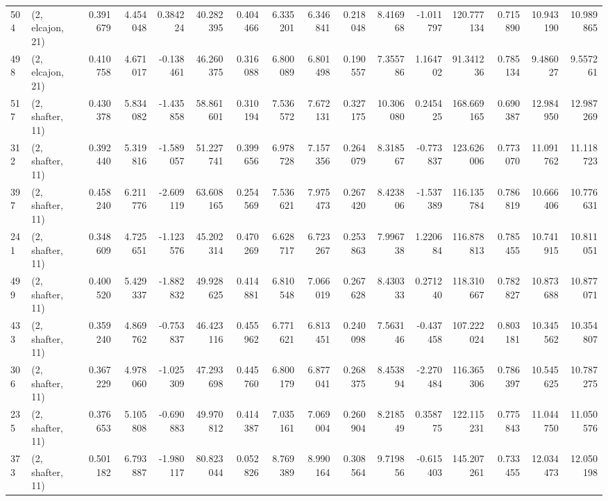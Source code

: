 \begin{tabular}{llrrrrrrrrrrrrrr}
504 &  (2, elcajon, 21) &   0.391679 &   4.454048 &   0.384224 &    40.282395 &   0.404466 &   6.335201 &   6.346841 &  0.218048 &   8.416968 &  -1.011797 &    120.777134 &   0.715890 &  10.943190 &   10.989865 \\
498 &  (2, elcajon, 21) &   0.410758 &   4.671017 &  -0.138461 &    46.260375 &   0.316088 &   6.800089 &   6.801498 &  0.190557 &   7.355786 &   1.164702 &     91.341236 &   0.785134 &   9.486027 &    9.557261 \\
517 &  (2, shafter, 11) &   0.430378 &   5.834082 &  -1.435858 &    58.861601 &   0.310194 &   7.536572 &   7.672131 &  0.327175 &  10.306080 &   0.245425 &    168.669165 &   0.690387 &  12.984950 &   12.987269 \\
312 &  (2, shafter, 11) &   0.392440 &   5.319816 &  -1.589057 &    51.227741 &   0.399656 &   6.978728 &   7.157356 &  0.264079 &   8.318567 &  -0.773837 &    123.626006 &   0.773070 &  11.091762 &   11.118723 \\
397 &  (2, shafter, 11) &   0.458240 &   6.211776 &  -2.609119 &    63.608165 &   0.254569 &   7.536621 &   7.975473 &  0.267420 &   8.423806 &  -1.537389 &    116.135784 &   0.786819 &  10.666406 &   10.776631 \\
241 &  (2, shafter, 11) &   0.348609 &   4.725651 &  -1.123576 &    45.202314 &   0.470269 &   6.628717 &   6.723267 &  0.253863 &   7.996738 &   1.220684 &    116.878813 &   0.785455 &  10.741915 &   10.811051 \\
499 &  (2, shafter, 11) &   0.400520 &   5.429337 &  -1.882832 &    49.928625 &   0.414881 &   6.810548 &   7.066019 &  0.267628 &   8.430333 &   0.271240 &    118.310667 &   0.782827 &  10.873688 &   10.877071 \\
433 &  (2, shafter, 11) &   0.359240 &   4.869762 &  -0.753837 &    46.423116 &   0.455962 &   6.771621 &   6.813451 &  0.240098 &   7.563146 &  -0.437458 &    107.222024 &   0.803181 &  10.345562 &   10.354807 \\
306 &  (2, shafter, 11) &   0.367229 &   4.978060 &  -1.025309 &    47.293698 &   0.445760 &   6.800179 &   6.877041 &  0.268375 &   8.453894 &  -2.270484 &    116.365306 &   0.786397 &  10.545625 &   10.787275 \\
235 &  (2, shafter, 11) &   0.376653 &   5.105808 &  -0.690883 &    49.970812 &   0.414387 &   7.035161 &   7.069004 &  0.260904 &   8.218549 &   0.358775 &    122.115231 &   0.775843 &  11.044750 &   11.050576 \\
373 &  (2, shafter, 11) &   0.501182 &   6.793887 &  -1.980117 &    80.823044 &   0.052826 &   8.769389 &   8.990164 &  0.308564 &   9.719856 &  -0.615403 &    145.207261 &   0.733455 &  12.034473 &   12.050198 \\

\end{tabular}
